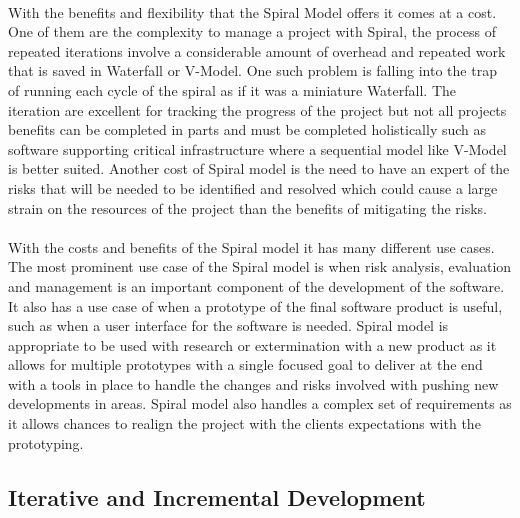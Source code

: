 \documentclass{style/CRPITStyle}
\begin{document}
\paragraph{}

With the benefits and flexibility that the Spiral Model offers it comes at a
cost. 
One of them are the complexity to manage a project with Spiral, the process of
repeated iterations involve a considerable amount of overhead and repeated work
that is saved in Waterfall or V-Model. One such
problem is falling into the trap of running each cycle of the spiral as if it
was a miniature Waterfall.
The iteration are excellent for tracking the progress of the project but not all
projects benefits can be completed in parts and must be completed holistically
such as software supporting critical infrastructure where a sequential model
like V-Model is better suited.
Another cost of Spiral model is the need to have an expert of the risks that
will be needed to be identified and resolved which could cause a large strain on the
resources of the project than the benefits of mitigating the risks.

\paragraph{}
With the costs and benefits of the Spiral model it has many different use cases.
The most prominent use case of the Spiral model is when risk analysis,
evaluation and management is an important component of the development of the
software. It also has a use case of when a prototype of the final software
product is useful, such as when a user interface for the software is needed.
Spiral model is appropriate to be used with research or extermination with a new
product as it allows for multiple prototypes with a single focused goal 
to deliver at the end with a tools in place to handle the changes and 
risks involved with pushing new developments in areas.
Spiral model also handles a complex set of requirements as it allows chances to
realign the project with the clients expectations with the prototyping.

\subsection{Iterative and Incremental Development} %
\end{document}
